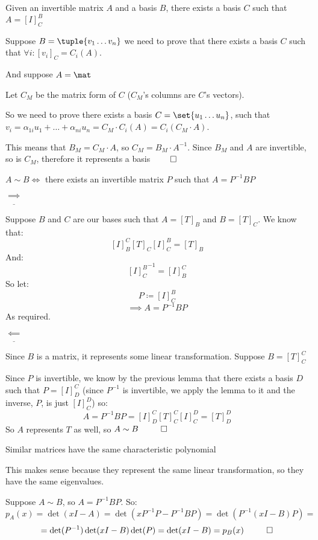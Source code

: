 \documentclass[10pt]{article}
\begin{document}
\begin{lemma*}{Given an invertible matrix $A$ and a basis $B$, there exists a basis $C$ such that $A=[I]^B_C$}

Suppose $B=\tuple{v_1\dots v_n}$ we need to prove that there exists a basis $C$ such that $\forall i: [v_i]_C = C_i(A)$. 

And suppose $A=\mat$

Let $C_M$ be the matrix form of $C$ ($C_M$'s columns are $C$'s vectors). 

So we need to prove there exists a basis $C=\set{u_1\dots u_n}$, such that $v_i=\alpha_{1i}u_1+\dots+\alpha_{ni}u_n = C_M\cdot C_i(A) = C_i(C_M\cdot A)$. 

This means that $B_M = C_M\cdot A$, so $C_M = B_M\cdot A^{-1}$. Since $B_M$ and $A$ are invertible, so is $C_M$, therefore it represents a basis $\qed$

\end{lemma*}

\newpage
\begin{theorem}{$A\sim B \iff$ there exists an invertible matrix $P$ such that $A=P^{-1}BP$}

$\underline{\implies}$ \begin{minipage}[t]{\dimexpr\textwidth - 2cm} 
Suppose $B$ and $C$ are our bases such that $A=[T]_B$ and $B=[T]_C$. We know that:
\[ [I]^C_B [T]_C [I]^B_C = [T]_B \]
And:
\[ {[I]^B_C}^{-1} = [I]^C_B \]
So let:
\[ P\coloneqq [I]^B_C \]
\[ \implies A = P^{-1}BP \]
As required.
\end{minipage}

$\underline{\impliedby}$ \begin{minipage}[t]{\dimexpr\textwidth-2cm}

Since $B$ is a matrix, it represents some linear transformation. Suppose $B=[T]^C_C$

Since $P$ is invertible, we know by the previous lemma that there exists a basis $D$ such that $P=[I]^C_D$ (since $P^{-1}$ is invertible, we apply the lemma to it and the inverse, $P$, is just $[I]^D_C$) so:
\[ A = P^{-1}BP = [I]^C_D [T]^C_C [I]^D_C = [T]^D_D \]
So $A$ represents $T$ as well, so $A\sim B ~~\qed$

\end{minipage}

\end{theorem}

\begin{theorem}{Similar matrices have the same characteristic polynomial}

This makes sense because they represent the same linear transformation, so they have the same eigenvalues.

Suppose $A\sim B$, so $A=P^{-1}BP$. So:
\[p_A(x) = \det(xI-A) = \det(xP^{-1}P - P^{-1}BP) = \det(P^{-1}(xI-B)P) = \]
\[ = \det(P^{-1})\det(xI-B)\det(P) = \det(xI-B) = p_B(x) ~~ \qed \]

\end{theorem}
\end{document}
